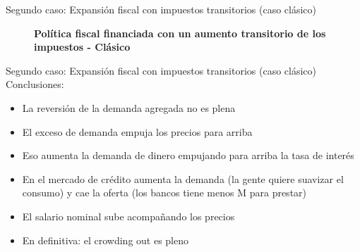 \documentclass{beamer}
\begin{document}
\begin{frame}{Segundo caso: Expansión fiscal con impuestos transitorios (caso clásico)}
\begin{center}
\begin{figure}[H]
\begin{center}
\end{center}
\vspace{0.7cm}
\caption{\textbf{Política fiscal financiada con un aumento transitorio de los impuestos - Clásico}}
\label{fig:C36.3}
\end{figure}
\end{center}
\end{frame}

\begin{frame}{Segundo caso: Expansión fiscal con impuestos transitorios (caso clásico)}
    Conclusiones:
   \begin{itemize}
       \item La reversión de la demanda agregada no es plena
       \item El exceso de demanda empuja los precios para arriba
       \item Eso aumenta la demanda de dinero empujando para arriba la tasa de interés
       \item En el mercado de crédito aumenta la demanda (la gente quiere suavizar el consumo) y cae la oferta (los bancos tiene menos M para prestar)
       \item El salario nominal sube acompañando los precios 
    \item En definitiva: el crowding out es pleno
    \end{itemize}
\end{frame}
\end{document}
